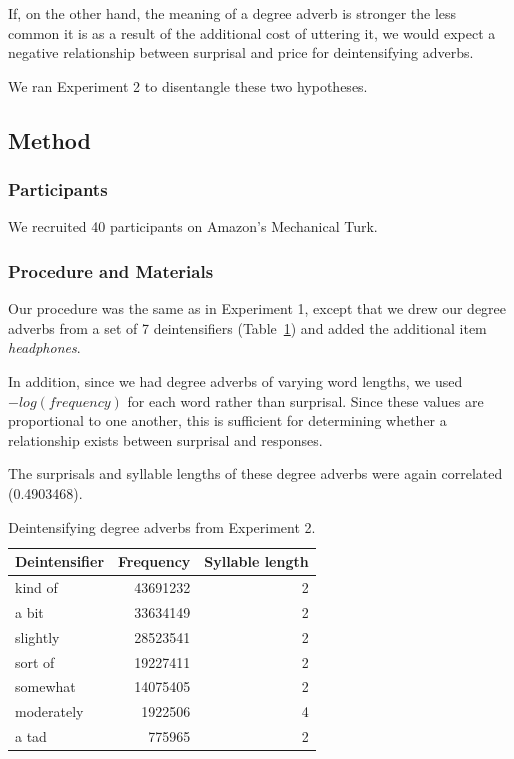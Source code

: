 \documentclass[10pt,letterpaper]{article}
\begin{document}
  If, on the other hand, the meaning of a degree adverb is stronger the less common it is as a result of the additional cost of uttering it, we would expect a negative relationship between surprisal and price for deintensifying adverbs.
  
  We ran Experiment 2 to disentangle these two hypotheses.

  \subsection{Method}
    \subsubsection{Participants}
    We recruited 40 participants on Amazon's Mechanical Turk.
    \subsubsection{Procedure and Materials}
      
      Our procedure was the same as in Experiment 1, except that we drew our degree adverbs from a set of 7 deintensifiers (Table~\ref{deintensifiers-table}) and added the additional item \emph{headphones}.
      
      In addition, since we had degree adverbs of varying word lengths, we used $-log(frequency)$ for each word rather than surprisal. Since these values are proportional to one another, this is sufficient for determining whether a relationship exists between surprisal and responses.
      
      The surprisals and syllable lengths of these degree adverbs were again correlated (0.4903468).
      
      \begin{table}[!ht]
      \begin{center} 
      \caption{Deintensifying degree adverbs from Experiment 2.} 
      \label{deintensifiers-table} 
      \vskip 0.12in
      \begin{tabular}{lrr} 
      \hline
      Deintensifier    &  Frequency & Syllable length \\
      \hline
      kind of & 43691232 & 2 \\ 
      a bit & 33634149 & 2 \\ 
      slightly & 28523541 & 2 \\ 
      sort of & 19227411 & 2 \\ 
      somewhat & 14075405 & 2 \\ 
      moderately & 1922506 & 4 \\ 
      a tad & 775965 & 2 \\  
      \hline
      \end{tabular} 
      \end{center} 
      \end{table}
\end{document}
